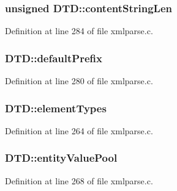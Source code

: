 \subsubsection[{\texorpdfstring{content\+String\+Len}{contentStringLen}}]{\setlength{\rightskip}{0pt plus 5cm}unsigned D\+T\+D\+::content\+String\+Len}\hypertarget{struct_d_t_d_a06377f1149c7a2ad3c2d932f2844acdf}{}\label{struct_d_t_d_a06377f1149c7a2ad3c2d932f2844acdf}


Definition at line 284 of file xmlparse.\+c.

\subsubsection[{\texorpdfstring{default\+Prefix}{defaultPrefix}}]{ D\+T\+D\+::default\+Prefix}\hypertarget{struct_d_t_d_aece86e4f1ee1d3c70d11e009914c1ff9}{}\label{struct_d_t_d_aece86e4f1ee1d3c70d11e009914c1ff9}


Definition at line 280 of file xmlparse.\+c.

\subsubsection[{\texorpdfstring{element\+Types}{elementTypes}}]{ D\+T\+D\+::element\+Types}\hypertarget{struct_d_t_d_a96a198838c9a76a867e54047562106ac}{}\label{struct_d_t_d_a96a198838c9a76a867e54047562106ac}


Definition at line 264 of file xmlparse.\+c.

\subsubsection[{\texorpdfstring{entity\+Value\+Pool}{entityValuePool}}]{ D\+T\+D\+::entity\+Value\+Pool}\hypertarget{struct_d_t_d_a80499c346a8c5f4ea1c9843002ad1705}{}\label{struct_d_t_d_a80499c346a8c5f4ea1c9843002ad1705}


Definition at line 268 of file xmlparse.\+c.

